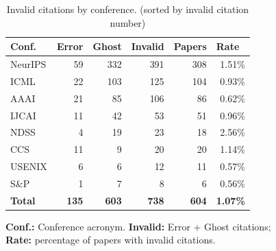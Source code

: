 \begin{table}[t]
  \centering
  \begin{threeparttable}
    \caption{Invalid citations by conference. (sorted by invalid citation number)}
    \label{tab:invalid_by_venue}
    \small
{}
\begin{tabular}{lrrrrr}
\toprule
\multicolumn{1}{l}{\textbf{Conf.}} & \multicolumn{1}{l}{\textbf{Error}} & \multicolumn{1}{l}{\textbf{Ghost}} & \multicolumn{1}{l}{\textbf{Invalid}} & \multicolumn{1}{l}{\textbf{Papers}} & \multicolumn{1}{l}{\cellcolor{red!20}\textbf{Rate}} \\
\midrule
NeurIPS & 59 & 332 & 391 & 308 & \cellcolor{red!35}1.51\% \\
ICML & 22 & 103 & 125 & 104 & \cellcolor{red!25}0.93\% \\
AAAI & 21 & 85 & 106 & 86 & \cellcolor{red!22}0.62\% \\
IJCAI & 11 & 42 & 53 & 51 & \cellcolor{red!23}0.96\% \\
\midrule
NDSS & 4 & 19 & 23 & 18 & \cellcolor{red!33}2.56\% \\
CCS & 11 & 9 & 20 & 20 & \cellcolor{red!25}1.14\% \\
USENIX & 6 & 6 & 12 & 11 & \cellcolor{red!20}0.57\% \\
S\&P & 1 & 7 & 8 & 6 & \cellcolor{red!22}0.56\% \\
\midrule
\textbf{Total} & \textbf{135} & \textbf{603} & \textbf{738} & \textbf{604} & \cellcolor{red!30}\textbf{1.07\%} \\
\bottomrule
\end{tabular}
    \begin{tablenotes}
      \footnotesize
      \item \textbf{Conf.:} Conference acronym.
\textbf{Invalid:} Error + Ghost citations;\\
\colorbox{red!22}{\textbf{Rate:}} percentage of papers with invalid citations.
    \end{tablenotes}
  \end{threeparttable}
\end{table}

